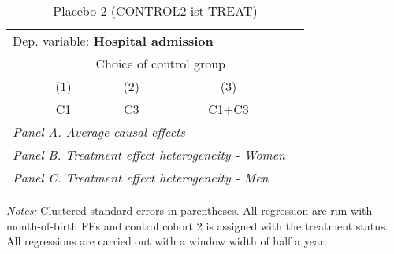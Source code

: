  \begin{table}[H] \centering \begin{threeparttable} \caption{Placebo 2 (CONTROL2 ist TREAT) } {\def\sym#1{\ifmmode^{#1}\else\(^{#1}\)\fi} \begin{tabular}{l*{4}{c}} \toprule \multicolumn{4}{l}{Dep. variable: \textbf{Hospital admission}} \\ & \multicolumn{3}{c}{Choice of control group} \\ \cmidrule(lr){2-4}
            &\multicolumn{1}{c}{(1)}&\multicolumn{1}{c}{(2)}&\multicolumn{1}{c}{(3)}\\
            &\multicolumn{1}{c}{C1}&\multicolumn{1}{c}{C3}&\multicolumn{1}{c}{C1+C3}\\
\midrule
 \multicolumn{4}{l}{\emph{Panel A. Average causal effects}} \\      \midrule\multicolumn{4}{l}{\emph{Panel B. Treatment effect heterogeneity - Women}} \\      \midrule\multicolumn{4}{l}{\emph{Panel C. Treatment effect heterogeneity - Men}} \\      
\bottomrule \end{tabular} } \begin{tablenotes} \item \scriptsize \emph{Notes:} Clustered standard errors in parentheses. All regression are run with month-of-birth FEs and control cohort 2 is assigned with the treatment status. All regressions are carried out with a window width of half a year. \end{tablenotes} \end{threeparttable} \end{table} 
